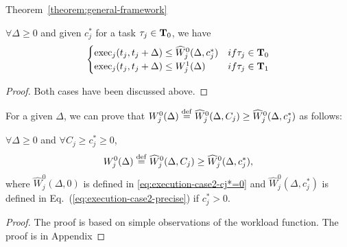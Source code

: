 \begin{appProof}{Theorem~\ref{theorem:general-framework}}
\begin{Lemma}
\label{lemma:Wj01-exact}
$\forall \Delta \geq 0$ and given $c_j^*$ for a task $\tau_j \in {\bf T}_0$, we have 
\[
\begin{cases}
\operatorname{exec}_j(t_j, t_j+\Delta) \leq \widehat{W}_j^0(\Delta, c_j^*) &\mbox{ if } \tau_j \in {\bf T}_0\\  
\operatorname{exec}_j(t_j, t_j+\Delta) \leq W_j^1(\Delta) &\mbox{ if } \tau_j \in {\bf T}_1  
 \end{cases}
\]
\end{Lemma}
\begin{proof}
  Both cases have been discussed above.
\end{proof}
For a given $\Delta$, we can prove that $W_j^0(\Delta)\equals \widehat{W}_j^0(\Delta, C_j) \geq \widehat{W}_j^0(\Delta, c_j^*)$ as follows:
\begin{Lemma}
\label{lemma:Wj0-dominate}
$\forall \Delta \geq 0$ and $\forall C_j\geq c_j^* \geq 0$,
\[
W_j^0(\Delta)\equals \widehat{W}_j^0(\Delta, C_j)  \geq \widehat{W}_j^0(\Delta, c_j^*),
\]
where $\widehat{W}_j^0(\Delta, 0)$ is defined in \eqref{eq:execution-case2-cj*=0}  and
$\widehat{W}_j^0(\Delta, c_j^*)$ is defined in Eq.~(\ref{eq:execution-case2-precise}) if $c_j^* > 0$.
\end{Lemma}
\begin{proof}
 The proof is based on simple observations of the workload function. The proof is in Appendix
\end{proof}





\end{appProof}
